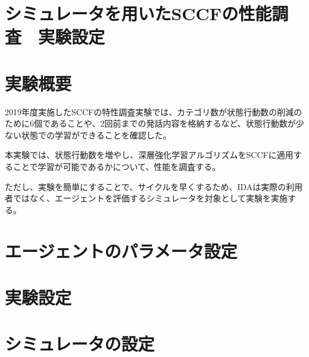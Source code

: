 \documentclass[11pt,a4paper]{jsarticle}
\begin{document}
%
%
\section*{シミュレータを用いたSCCFの性能調査　実験設定}
\section{実験概要}
2019年度実施したSCCFの特性調査実験では、カテゴリ数が状態行動数の削減のために6個であることや、2回前までの発話内容を格納するなど、状態行動数が少ない状態での学習ができることを確認した。

本実験では、状態行動数を増やし、深層強化学習アルゴリズムをSCCFに適用することで学習が可能であるかについて、性能を調査する。

ただし、実験を簡単にすることで、サイクルを早くするため、IDAは実際の利用者ではなく、エージェントを評価するシミュレータを対象として実験を実施する。
\section{エージェントのパラメータ設定}
\section{実験設定}
\section{シミュレータの設定}

%
%
\end{document}
